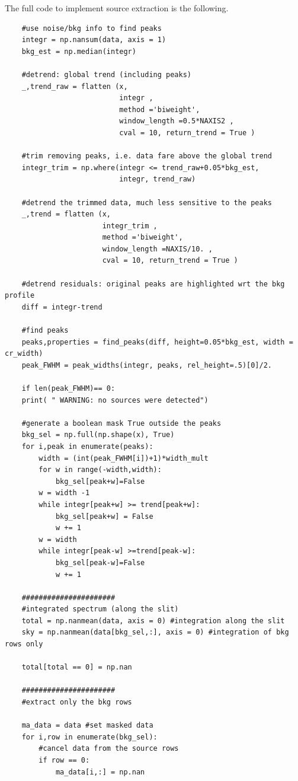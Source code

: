 The full code to implement source extraction is the following.
\begin{lstlisting}
	#use noise/bkg info to find peaks
	integr = np.nansum(data, axis = 1)
	bkg_est = np.median(integr)
	
	#detrend: global trend (including peaks)
	_,trend_raw = flatten (x,
	                       integr ,
	                       method ='biweight',
   	                       window_length =0.5*NAXIS2 ,
	                       cval = 10, return_trend = True )
	
	#trim removing peaks, i.e. data fare above the global trend
	integr_trim = np.where(integr <= trend_raw+0.05*bkg_est,
	                       integr, trend_raw)
	
	#detrend the trimmed data, much less sensitive to the peaks
	_,trend = flatten (x,
	                   integr_trim ,
	                   method ='biweight',
	                   window_length =NAXIS/10. ,
	                   cval = 10, return_trend = True )
	
	#detrend residuals: original peaks are highlighted wrt the bkg profile
	diff = integr-trend
	
	#find peaks
	peaks,properties = find_peaks(diff, height=0.05*bkg_est, width = cr_width)
	peak_FWHM = peak_widths(integr, peaks, rel_height=.5)[0]/2.
	
	if len(peak_FWHM)== 0:
	print( " WARNING: no sources were detected")
	
	#generate a boolean mask True outside the peaks
	bkg_sel = np.full(np.shape(x), True)
	for i,peak in enumerate(peaks):
		width = (int(peak_FWHM[i])+1)*width_mult
		for w in range(-width,width):
			bkg_sel[peak+w]=False
		w = width -1
		while integr[peak+w] >= trend[peak+w]:
			bkg_sel[peak+w] = False
			w += 1
		w = width
		while integr[peak-w] >=trend[peak-w]:
			bkg_sel[peak-w]=False
			w += 1
	
	######################
	#integrated spectrum (along the slit)
	total = np.nanmean(data, axis = 0) #integration along the slit
	sky = np.nanmean(data[bkg_sel,:], axis = 0) #integration of bkg rows only
	
	total[total == 0] = np.nan
	
	######################
	#extract only the bkg rows
	
	ma_data = data #set masked data
	for i,row in enumerate(bkg_sel):
		#cancel data from the source rows
		if row == 0:
			ma_data[i,:] = np.nan
\end{lstlisting}





